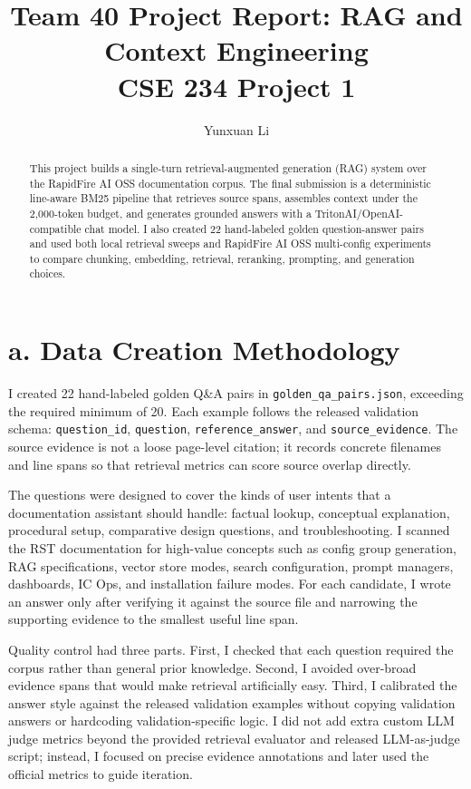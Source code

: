 \documentclass[11pt,twocolumn]{article}
\title{\vspace{-1.2em}\textbf{Team 40 Project Report: RAG and Context Engineering}\\
\large CSE 234 Project 1}
\author{Yunxuan Li}
\date{}
\newcommand{\code}[1]{\texttt{\footnotesize #1}}
\begin{document}
\maketitle
\vspace{-1.3em}

\begin{abstract}
This project builds a single-turn retrieval-augmented generation (RAG) system over the RapidFire AI OSS documentation corpus. The final submission is a deterministic line-aware BM25 pipeline that retrieves source spans, assembles context under the 2,000-token budget, and generates grounded answers with a TritonAI/OpenAI-compatible chat model. I also created 22 hand-labeled golden question-answer pairs and used both local retrieval sweeps and RapidFire AI OSS multi-config experiments to compare chunking, embedding, retrieval, reranking, prompting, and generation choices.
\end{abstract}
\vspace{-0.8em}

\section{a. Data Creation Methodology}

I created 22 hand-labeled golden Q\&A pairs in \code{golden\_qa\_pairs.json}, exceeding the required minimum of 20. Each example follows the released validation schema: \code{question\_id}, \code{question}, \code{reference\_answer}, and \code{source\_evidence}. The source evidence is not a loose page-level citation; it records concrete filenames and line spans so that retrieval metrics can score source overlap directly.

The questions were designed to cover the kinds of user intents that a documentation assistant should handle: factual lookup, conceptual explanation, procedural setup, comparative design questions, and troubleshooting. I scanned the RST documentation for high-value concepts such as config group generation, RAG specifications, vector store modes, search configuration, prompt managers, dashboards, IC Ops, and installation failure modes. For each candidate, I wrote an answer only after verifying it against the source file and narrowing the supporting evidence to the smallest useful line span.

Quality control had three parts. First, I checked that each question required the corpus rather than general prior knowledge. Second, I avoided over-broad evidence spans that would make retrieval artificially easy. Third, I calibrated the answer style against the released validation examples without copying validation answers or hardcoding validation-specific logic. I did not add extra custom LLM judge metrics beyond the provided retrieval evaluator and released LLM-as-judge script; instead, I focused on precise evidence annotations and later used the official metrics to guide iteration.
\end{document}
